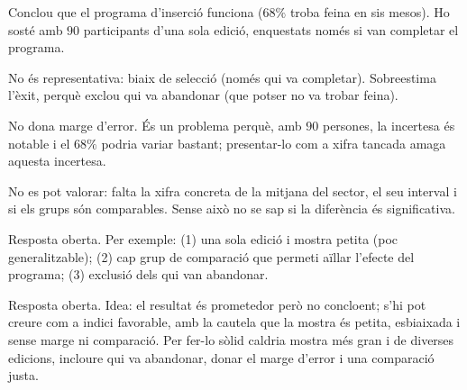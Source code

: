 \begin{solucions}
\begin{sollist}
  \item Conclou que el programa d'inserció funciona ($68\%$ troba feina en sis mesos). Ho
        sosté amb $90$ participants d'una sola edició, enquestats només si van completar el
        programa.
  \item No és representativa: biaix de selecció (només qui va completar). Sobreestima
        l'èxit, perquè exclou qui va abandonar (que potser no va trobar feina).
  \item No dona marge d'error. És un problema perquè, amb $90$ persones, la incertesa és
        notable i el $68\%$ podria variar bastant; presentar-lo com a xifra tancada amaga
        aquesta incertesa.
  \item No es pot valorar: falta la xifra concreta de la mitjana del sector, el seu
        interval i si els grups són comparables. Sense això no se sap si la diferència és
        significativa.
  \item Resposta oberta. Per exemple: (1) una sola edició i mostra petita (poc
        generalitzable); (2) cap grup de comparació que permeti aïllar l'efecte del
        programa; (3) exclusió dels qui van abandonar.
  \item Resposta oberta. Idea: el resultat és prometedor però no concloent; s'hi pot creure
        com a indici favorable, amb la cautela que la mostra és petita, esbiaixada i sense
        marge ni comparació. Per fer-lo sòlid caldria mostra més gran i de diverses
        edicions, incloure qui va abandonar, donar el marge d'error i una comparació justa.
\end{sollist}
\end{solucions}

